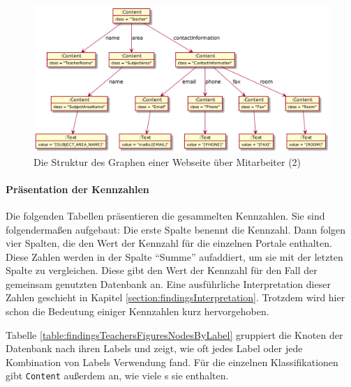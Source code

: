     \begin{figure}[htb]
        \centering
        \includegraphics[scale=\imageScalingFactor]{../resources/findings/case-study-1/dbmodel/dbmodel2.png}
        \caption{Die Struktur des Graphen einer Webseite über Mitarbeiter (2)}
        \label{image:findingTeachersFiguresDbModel2}
    \end{figure}

    \paragraph{Präsentation der Kennzahlen}
    Die folgenden Tabellen präsentieren die gesammelten Kennzahlen.
    Sie sind folgendermaßen aufgebaut:
    Die erste Spalte benennt die Kennzahl.
    Dann folgen vier Spalten, die den Wert der Kennzahl für die einzelnen Portale enthalten.
    Diese Zahlen werden in der Spalte "`Summe"' aufaddiert,
    um sie mit der letzten Spalte zu vergleichen.
    Diese gibt den Wert der Kennzahl für den Fall der gemeinsam genutzten Datenbank an.
    Eine ausführliche Interpretation dieser Zahlen geschieht in Kapitel \ref{section:findingsInterpretation}.
    Trotzdem wird hier schon die Bedeutung einiger Kennzahlen kurz hervorgehoben.

    Tabelle \ref{table:findingsTeachersFiguresNodesByLabel}
    gruppiert die Knoten der Datenbank nach ihren Labels und zeigt,
    wie oft jedes Label oder jede Kombination von Labels Verwendung fand.   
    Für die einzelnen Klassifikationen gibt \texttt{Content} außerdem an,
    wie viele {\contentFeature}s sie enthalten.

